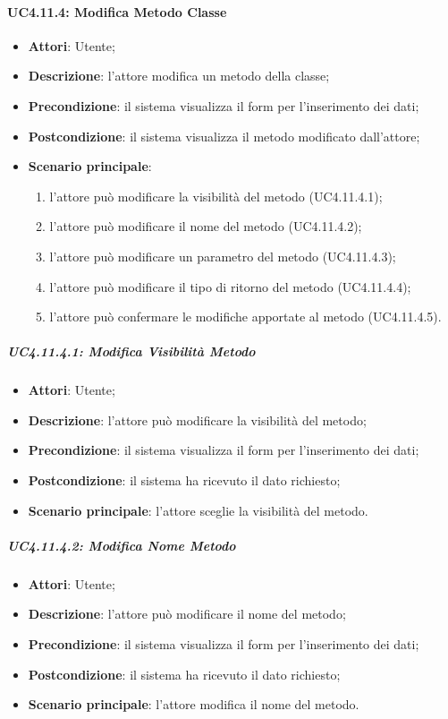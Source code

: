 \begin{itemize}
\begin{itemize}
\begin{itemize}
\begin{itemize}
\paragraph{UC4.11.4: Modifica Metodo Classe}
\label{UC4.11.4}
\begin{itemize}
	\item \textbf{Attori}: Utente;
	\item \textbf{Descrizione}: l'attore modifica un metodo della classe;
	\item \textbf{Precondizione}: il sistema visualizza il form per l'inserimento dei dati;
	\item \textbf{Postcondizione}: il sistema visualizza il metodo modificato dall'attore;
	\item \textbf{Scenario principale}:
	\begin{enumerate}
		\item l'attore può modificare la visibilità del metodo (UC4.11.4.1);
		\item l'attore può modificare il nome del metodo (UC4.11.4.2);
		\item l'attore può modificare un parametro del metodo (UC4.11.4.3);
		\item l'attore può modificare il tipo di ritorno del metodo (UC4.11.4.4);
		\item l'attore può confermare le modifiche apportate al metodo (UC4.11.4.5).
	\end{enumerate}
\end{itemize}

\subparagraph{UC4.11.4.1: Modifica Visibilità Metodo}
\label{UC4.11.4.1}
\begin{itemize}
	\item \textbf{Attori}: Utente;
	\item \textbf{Descrizione}: l'attore può modificare la visibilità del metodo;
	\item \textbf{Precondizione}: il sistema visualizza il form per l'inserimento dei dati;
	\item \textbf{Postcondizione}: il sistema ha ricevuto il dato richiesto;
	\item \textbf{Scenario principale}: l'attore sceglie la visibilità del metodo.
\end{itemize}

\subparagraph{UC4.11.4.2: Modifica Nome Metodo}
\label{UC4.11.4.2}
\begin{itemize}
	\item \textbf{Attori}: Utente;
	\item \textbf{Descrizione}: l'attore può modificare il nome del metodo;
	\item \textbf{Precondizione}: il sistema visualizza il form per l'inserimento dei dati;
	\item \textbf{Postcondizione}: il sistema ha ricevuto il dato richiesto;
	\item \textbf{Scenario principale}: l'attore modifica il nome del metodo.
\end{itemize}


\end{itemize}
\end{itemize}
\end{itemize}
\end{itemize}
